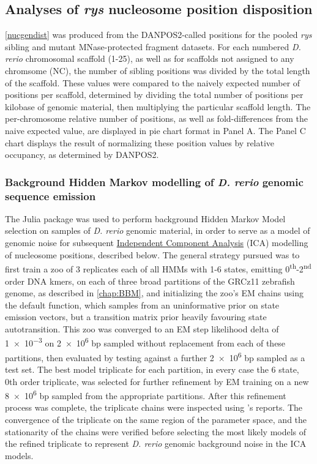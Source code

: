 \subsection{Analyses of \textit{rys} nucleosome position disposition}
\label{ssec:rysnucpos}
\autoref{nucgendist} was produced from the DANPOS2-called positions for the pooled \textit{rys} sibling and mutant MNase-protected fragment datasets. For each numbered \textit{D. rerio} chromosomal scaffold (1-25), as well as for scaffolds not assigned to any chromsome (NC), the number of sibling positions was divided by the total length of the scaffold. These values were compared to the naively expected number of positions per scaffold, determined by dividing the total number of positions per kilobase of genomic material, then multiplying the particular scaffold length. The per-chromosome relative number of positions, as well as fold-differences from the naive expected value, are displayed in pie chart format in Panel A. The Panel C chart displays the result of normalizing these position values by relative occupancy, as determined by DANPOS2. 

\subsubsection{Background Hidden Markov modelling of \textit{D. rerio} genomic sequence emission}
The Julia package  was used to perform background Hidden Markov Model selection on samples of \textit{D. rerio} genomic material, in order to serve as a model of genomic noise for subsequent \hyperref[ssec:ICA]{Independent Component Analysis} (ICA) modelling of nucleosome positions, described below. The general strategy pursued was to first train a zoo of 3 replicates each of all HMMs with 1-6 states, emitting 0\textsuperscript{th}-2\textsuperscript{nd} order DNA kmers, on each of three broad partitions of the GRCz11 zebrafish genome, as described in \autoref{chap:BBM}, and initializing the zoo's EM chains using the default  function, which samples from an uninformative prior on state emission vectors, but a transition matrix prior heavily favouring state autotransition. This zoo was converged to an EM step likelihood delta of \num{1e-3} on \num{2e6} bp sampled without replacement from each of these partitions, then evaluated by testing against a further \num{2e6} bp sampled as a test set. The best model triplicate for each partition, in every case the 6 state, 0th order triplicate, was selected for further refinement by EM training on a new \num{8e6} bp sampled from the appropriate partitions. After this refinement process was complete, the triplicate chains were inspected using 's reports. The convergence of the triplicate on the same region of the parameter space, and the stationarity of the chains were verified before selecting the most likely models of the refined triplicate to represent \textit{D. rerio} genomic background noise in the  ICA models.

